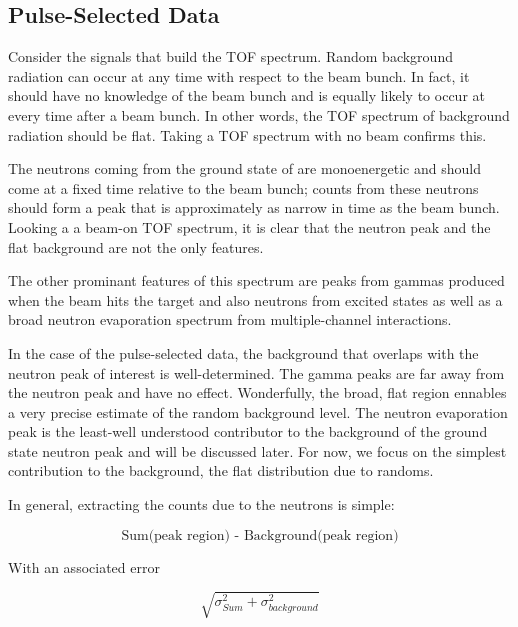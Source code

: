 \subsection{Pulse-Selected Data}
Consider the signals that build the TOF spectrum.  Random background radiation can occur at any time with respect to the beam bunch.  In fact, it should have no knowledge of the beam bunch and is equally likely to occur at every time after a beam bunch.  In other words, the TOF spectrum of background radiation should be flat.  Taking a TOF spectrum with no beam confirms this.


The neutrons coming from the ground state of  are monoenergetic and should come at a fixed time relative to the beam bunch; counts from these neutrons should form a peak that is approximately as narrow in time as the beam bunch.  Looking a a beam-on TOF spectrum, it is clear that the neutron peak and the flat background are not the only features.


The other prominant features of this spectrum are peaks from gammas produced when the beam hits the target and also neutrons from excited states as well as a broad neutron evaporation spectrum from multiple-channel interactions.

In the case of the pulse-selected data, the background that overlaps with the neutron peak of interest is well-determined.  The gamma peaks are far away from the neutron peak and have no effect.  Wonderfully, the broad, flat region ennables a very precise estimate of the random background level.  The neutron evaporation peak is the least-well understood contributor to the background of the ground state neutron peak and will be discussed later.  For now, we focus on the simplest contribution to the background, the flat distribution due to randoms.

In general, extracting the counts due to the neutrons is simple:

\begin{equation}
\text{Sum(peak region) - Background(peak region)}
\label{eq:counts}
\end{equation}

With an associated error

\begin{equation}
\sqrt{\sigma_{Sum}^2 + \sigma_{background}^2}
\label{eq:errDef}
\end{equation}

